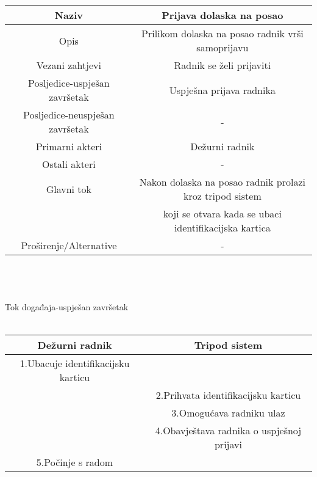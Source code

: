 \documentclass[12pt]{article}
\begin{document}
\begin{tabular}{|c|c|}
\hline
Naziv&Prijava dolaska na posao\\
\hline
Opis&Prilikom dolaska na posao radnik vrši samoprijavu\\
\hline
Vezani zahtjevi&Radnik se želi prijaviti\\
\hline
Posljedice-uspješan završetak&Uspješna prijava radnika\\
\hline
Posljedice-neuspješan završetak&-\\
\hline
Primarni akteri&Dežurni radnik\\
\hline
Ostali akteri&-\\
\hline
Glavni tok&Nakon dolaska na posao radnik prolazi kroz tripod sistem\\& koji se otvara kada se ubaci identifikacijska kartica\\
\hline
Proširenje/Alternative&-\\
\hline
\end{tabular}
\\ \\ \\Tok događaja-uspješan završetak\\ \\
\begin{tabular}{|c|c|}
\hline
Dežurni radnik&Tripod sistem\\
\hline
1.Ubacuje identifikacijsku karticu&\\
\hline
&2.Prihvata identifikacijsku karticu\\
\hline
&3.Omogućava radniku ulaz\\
\hline
&4.Obavještava radnika o uspješnoj prijavi\\
\hline
5.Počinje s radom&\\
\hline

\end{tabular}
\end{document}
